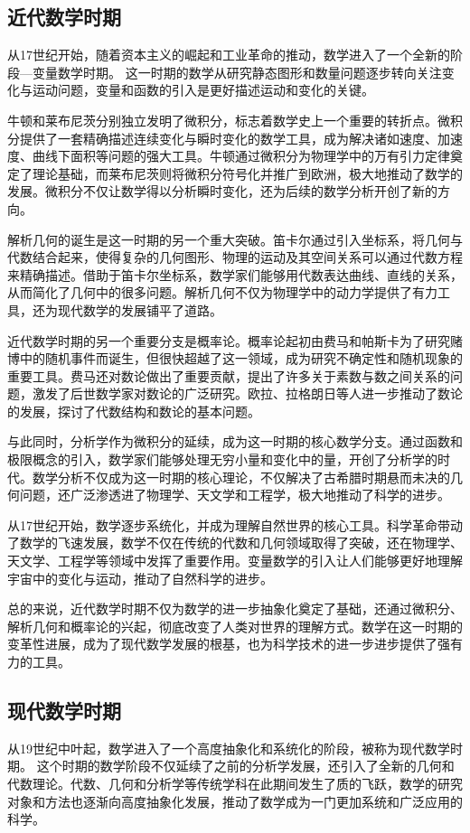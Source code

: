 \subsection{近代数学时期}
从17世纪开始，随着资本主义的崛起和工业革命的推动，数学进入了一个全新的阶段---变量数学时期。
这一时期的数学从研究静态图形和数量问题逐步转向关注变化与运动问题，变量和函数的引入是更好描述运动和变化的关键。

牛顿和莱布尼茨分别独立发明了微积分，标志着数学史上一个重要的转折点。微积分提供了一套精确描述连续变化与瞬时变化的数学工具，成为解决诸如速度、加速度、曲线下面积等问题的强大工具。牛顿通过微积分为物理学中的万有引力定律奠定了理论基础，而莱布尼茨则将微积分符号化并推广到欧洲，极大地推动了数学的发展。微积分不仅让数学得以分析瞬时变化，还为后续的数学分析开创了新的方向。

解析几何的诞生是这一时期的另一个重大突破。笛卡尔通过引入坐标系，将几何与代数结合起来，使得复杂的几何图形、物理的运动及其空间关系可以通过代数方程来精确描述。借助于笛卡尔坐标系，数学家们能够用代数表达曲线、直线的关系，从而简化了几何中的很多问题。解析几何不仅为物理学中的动力学提供了有力工具，还为现代数学的发展铺平了道路。

近代数学时期的另一个重要分支是概率论。概率论起初由费马和帕斯卡为了研究赌博中的随机事件而诞生，但很快超越了这一领域，成为研究不确定性和随机现象的重要工具。费马还对数论做出了重要贡献，提出了许多关于素数与数之间关系的问题，激发了后世数学家对数论的广泛研究。欧拉、拉格朗日等人进一步推动了数论的发展，探讨了代数结构和数论的基本问题。

与此同时，分析学作为微积分的延续，成为这一时期的核心数学分支。通过函数和极限概念的引入，数学家们能够处理无穷小量和变化中的量，开创了分析学的时代。数学分析不仅成为这一时期的核心理论，不仅解决了古希腊时期悬而未决的几何问题，还广泛渗透进了物理学、天文学和工程学，极大地推动了科学的进步。

从17世纪开始，数学逐步系统化，并成为理解自然世界的核心工具。科学革命带动了数学的飞速发展，数学不仅在传统的代数和几何领域取得了突破，还在物理学、天文学、工程学等领域中发挥了重要作用。变量数学的引入让人们能够更好地理解宇宙中的变化与运动，推动了自然科学的进步。

总的来说，近代数学时期不仅为数学的进一步抽象化奠定了基础，还通过微积分、解析几何和概率论的兴起，彻底改变了人类对世界的理解方式。数学在这一时期的变革性进展，成为了现代数学发展的根基，也为科学技术的进一步进步提供了强有力的工具。

\subsection{现代数学时期}
从19世纪中叶起，数学进入了一个高度抽象化和系统化的阶段，被称为现代数学时期。
这个时期的数学阶段不仅延续了之前的分析学发展，还引入了全新的几何和代数理论。代数、几何和分析学等传统学科在此期间发生了质的飞跃，数学的研究对象和方法也逐渐向高度抽象化发展，推动了数学成为一门更加系统和广泛应用的科学。


